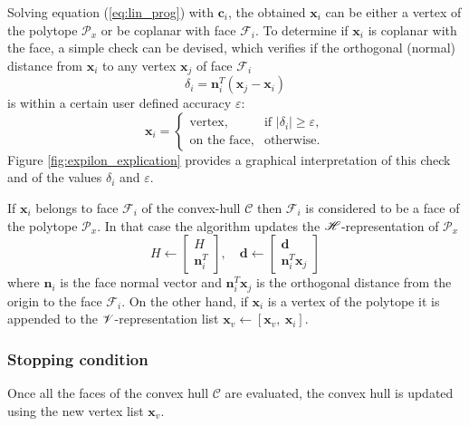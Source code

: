 Solving equation (\ref{eq:lin_prog}) with $\bm{c}_i$, the obtained $\bm{x}_i$ can be either a vertex of the polytope $\mathcal{P}_x$ or be coplanar with face $\mathcal{F}_i$. To determine if  $\bm{x}_i$ is coplanar with the face, a simple check can be devised, which verifies if the orthogonal (normal) distance from $\bm{x}_i$ to any vertex $\bm{x}_{j}$ of face $\mathcal{F}_i$
\begin{equation}
    \delta_i = \bm{n}_i^T(\bm{x}_{j} - \bm{x}_i)
\label{eq:normal_distance}
\end{equation}
is within a certain user defined accuracy $\varepsilon$:
\begin{equation}
    \bm{x}_i = \begin{cases}
   \text{vertex}, & \text{if }  |\delta_i| \geq \varepsilon, \\
    \text{on the face}, & \text{otherwise}.
\end{cases} 
\label{eq:normal_coplanar_test}
\end{equation}
Figure \ref{fig:expilon_explication} provides a graphical interpretation of this check and of the values $\delta_i$ and $\varepsilon$.

If $\bm{x}_i$ belongs to face $\mathcal{F}_i$ of the convex-hull $\mathcal{C}$ then  $\mathcal{F}_i$ is considered to be a face of the polytope $\mathcal{P}_x$. In that case the algorithm updates the $\mathscr{H}$-representation of $\mathcal{P}_x$ 
\begin{equation}
    H \leftarrow \begin{bmatrix} H \\ \bm{n}_i^T\end{bmatrix}, \quad \bm{d} \leftarrow \begin{bmatrix}  \bm{d} \\ \bm{n}^T_i \bm{x}_{j} \end{bmatrix}
\label{eq:h_rep}
\end{equation}
where $\bm{n}_i$ is the face normal vector and $\bm{n}_i^T \bm{x}_{j}$ is the orthogonal distance from the origin to the face $\mathcal{F}_i$. On the other hand, if $\bm{x}_i$ is a vertex of the polytope it is appended to the $\mathscr{V}$-representation list $\bm{x}_v \leftarrow [\bm{x}_v, ~\bm{x}_i]$.

\subsubsection{Stopping condition} Once all the faces of the convex hull $\mathcal{C}$ are evaluated, the convex hull is updated using the new vertex list $\bm{x}_v$.

